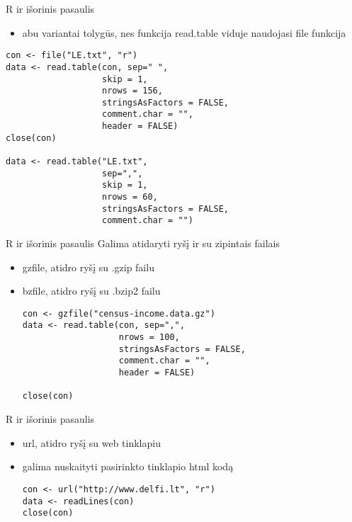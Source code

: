 \documentclass[11pt,xcolor=table]{beamer}
\begin{document}
\begin{frame}[fragile]{R ir išorinis pasaulis}
\begin{itemize}
\item abu variantai tolygūs, nes funkcija read.table viduje naudojasi file funkcija
\end{itemize}
\begin{lstlisting}
con <- file("LE.txt", "r")
data <- read.table(con, sep=" ", 
                   skip = 1, 
                   nrows = 156, 
                   stringsAsFactors = FALSE, 
                   comment.char = "", 
                   header = FALSE)
close(con)

data <- read.table("LE.txt", 
                   sep=",", 
                   skip = 1, 
                   nrows = 60, 
                   stringsAsFactors = FALSE, 
                   comment.char = "")
\end{lstlisting}

\end{frame}





\begin{frame}[fragile]{R ir išorinis pasaulis}
Galima atidaryti ryšį ir su zipintais failais
\begin{itemize}
\item gzfile, atidro ryšį su .gzip failu
\item bzfile, atidro ryšį su .bzip2 failu
\begin{lstlisting}
con <- gzfile("census-income.data.gz")
data <- read.table(con, sep=",", 
                   nrows = 100, 
                   stringsAsFactors = FALSE, 
                   comment.char = "", 
                   header = FALSE)

close(con)
\end{lstlisting}
\end{itemize}
\end{frame}


\begin{frame}[fragile]{R ir išorinis pasaulis}
\begin{itemize}
\item url, atidro ryšį su web tinklapiu
\item galima nuskaityti pasirinkto tinklapio html kodą
\begin{lstlisting}
con <- url("http://www.delfi.lt", "r")
data <- readLines(con)
close(con)
\end{lstlisting}
\end{itemize}
\end{frame}
\end{document}
